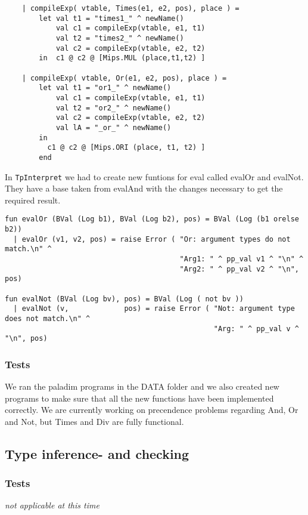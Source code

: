 \documentclass[11pt]{article}
\begin{document}
\begin{lstlisting}
    | compileExp( vtable, Times(e1, e2, pos), place ) =
        let val t1 = "times1_" ^ newName()
            val c1 = compileExp(vtable, e1, t1)
            val t2 = "times2_" ^ newName()
            val c2 = compileExp(vtable, e2, t2)
        in  c1 @ c2 @ [Mips.MUL (place,t1,t2) ]
        
    | compileExp( vtable, Or(e1, e2, pos), place ) =
        let val t1 = "or1_" ^ newName()
            val c1 = compileExp(vtable, e1, t1)
            val t2 = "or2_" ^ newName()
            val c2 = compileExp(vtable, e2, t2)
            val lA = "_or_" ^ newName()
        in
          c1 @ c2 @ [Mips.ORI (place, t1, t2) ]
        end
\end{lstlisting}        

In {\tt TpInterpret} we had to create new funtions for eval called evalOr and evalNot. They have a base taken from evalAnd with the changes necessary to get the required result.

\begin{lstlisting}
fun evalOr (BVal (Log b1), BVal (Log b2), pos) = BVal (Log (b1 orelse b2))
  | evalOr (v1, v2, pos) = raise Error ( "Or: argument types do not match.\n" ^
                                         "Arg1: " ^ pp_val v1 ^ "\n" ^
                                         "Arg2: " ^ pp_val v2 ^ "\n", pos)
                                         
fun evalNot (BVal (Log bv), pos) = BVal (Log ( not bv ))
  | evalNot (v,             pos) = raise Error ( "Not: argument type does not match.\n" ^
                                                 "Arg: " ^ pp_val v ^ "\n", pos)
\end{lstlisting}

\subsubsection{Tests}
We ran the paladim programs in the DATA folder and we also created new programs to make sure that all the new functions have been implemented correctly. We are currently working on precendence problems regarding And, Or and Not, but Times and Div are fully functional.
 
\subsection{Type inference- and checking}


\subsubsection{Tests}
{\it not applicable at this time}%
\end{document}
